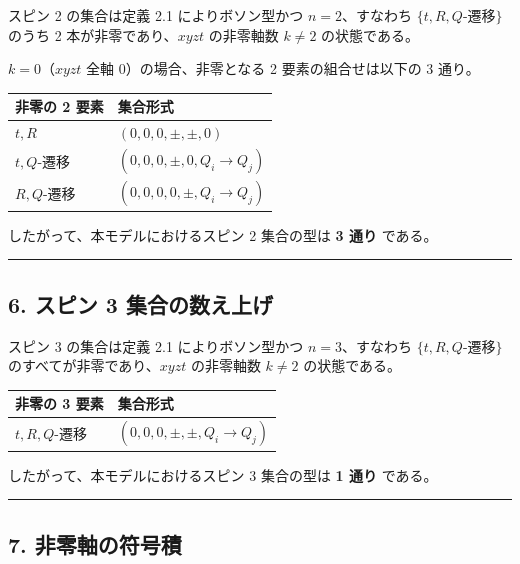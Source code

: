 \documentclass[
  a4paper,11pt]{ltjsarticle}
\newcounter{none}
\theoremstyle{definition}
\theoremstyle{remark}
\begin{document}
スピン 2 の集合は定義 2.1 によりボソン型かつ \(n = 2\)、すなわち
\(\{t, R, Q\text{-遷移}\}\) のうち 2 本が非零であり、\(xyzt\) の非零軸数
\(k \neq 2\) の状態である。

\(k = 0\)（\(xyzt\) 全軸 \(0\)）の場合、非零となる 2
要素の組合せは以下の 3 通り。

{\def\LTcaptype{none} %
\begin{longtable}[]{@{}ll@{}}
\toprule\noalign{}
非零の 2 要素 & 集合形式 \\
\midrule\noalign{}
\endhead
\bottomrule\noalign{}
\endlastfoot
\(t, R\) & \((0, 0, 0, \pm, \pm, 0)\) \\
\(t, Q\)-遷移 & \((0, 0, 0, \pm, 0, Q_i \to Q_j)\) \\
\(R, Q\)-遷移 & \((0, 0, 0, 0, \pm, Q_i \to Q_j)\) \\
\end{longtable}
}

したがって、本モデルにおけるスピン 2 集合の型は \textbf{3 通り} である。

\begin{center}\rule{0.5\linewidth}{0.5pt}\end{center}

\subsection{6. スピン 3
集合の数え上げ}\label{ux30b9ux30d4ux30f3-3-ux96c6ux5408ux306eux6570ux3048ux4e0aux3052}

スピン 3 の集合は定義 2.1 によりボソン型かつ \(n = 3\)、すなわち
\(\{t, R, Q\text{-遷移}\}\) のすべてが非零であり、\(xyzt\) の非零軸数
\(k \neq 2\) の状態である。

{\def\LTcaptype{none} %
\begin{longtable}[]{@{}ll@{}}
\toprule\noalign{}
非零の 3 要素 & 集合形式 \\
\midrule\noalign{}
\endhead
\bottomrule\noalign{}
\endlastfoot
\(t, R, Q\)-遷移 & \((0, 0, 0, \pm, \pm, Q_i \to Q_j)\) \\
\end{longtable}
}

したがって、本モデルにおけるスピン 3 集合の型は \textbf{1 通り} である。

\begin{center}\rule{0.5\linewidth}{0.5pt}\end{center}

\subsection{7.
非零軸の符号積}\label{ux975eux96f6ux8ef8ux306eux7b26ux53f7ux7a4d}
\end{document}

